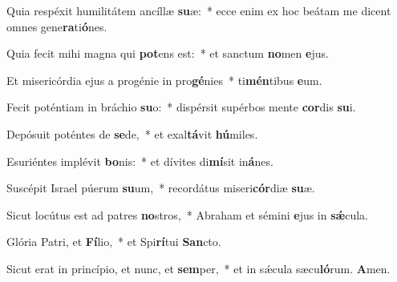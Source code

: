 \item Quia respéxit humilitátem ancíllæ \textbf{su}æ:~* ecce enim ex hoc beátam me dicent omnes gene\textbf{ra}ti\textbf{ó}nes.
\item Quia fecit mihi magna qui \textbf{pot}ens est:~* et san\-ctum \textbf{no}men \textbf{e}jus.
\item Et misericórdia ejus a progénie in pro\textbf{gé}nies~* ti\textbf{mén}tibus \textbf{e}um.
\item Fecit poténtiam in bráchio \textbf{su}o:~* dispérsit supérbos mente \textbf{cor}dis \textbf{su}i.
\item Depósuit poténtes de \textbf{se}de,~* et exal\textbf{tá}vit \textbf{hú}miles.
\item Esuriéntes implévit \textbf{bo}nis:~* et dívites di\textbf{mí}sit in\textbf{á}nes.
\item Suscépit Israel púerum \textbf{su}um,~* recordátus miseri\textbf{cór}diæ \textbf{su}æ.
\item Sicut locútus est ad patres \textbf{no}stros,~* Abraham et sémini \textbf{e}jus in \textbf{sǽ}cula.
\item Glória Patri, et \textbf{Fí}lio,~* et Spi\textbf{rí}tui \textbf{San}cto.
\item Sicut erat in princípio, et nunc, et \textbf{sem}per,~* et in sǽcula sæcu\textbf{ló}rum. \textbf{A}men.